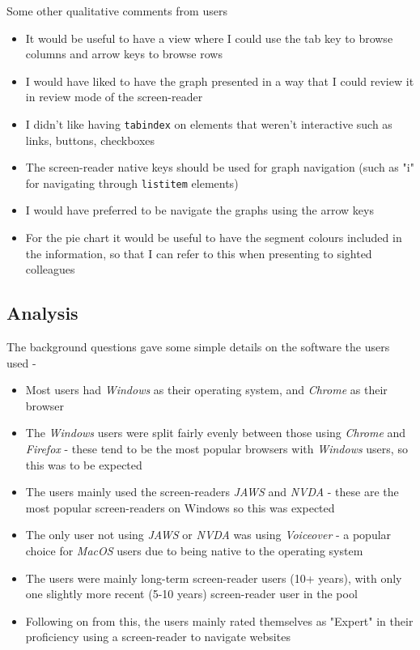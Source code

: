 \documentclass[ %
                    author={Aleena Baig},
                supervisor={Dr Simon Lock},
                    degree={BSc},
                     title={On Making Web Accessible Graphs},
                  subtitle={},
                      year={2019} ]{dissertation}
\begin{document}
Some other qualitative comments from users

\begin{itemize}
    \item It would be useful to have a view where I could use the tab key to browse columns and arrow keys to browse rows
    \item I would have liked to have the graph presented in a way that I could review it in review mode of the screen-reader
    \item I didn't like having \texttt{tabindex} on elements that weren't interactive such as links, buttons, checkboxes
    \item The screen-reader native keys should be used for graph navigation (such as "i" for navigating through \texttt{listitem} elements)
    \item I would have preferred to be navigate the graphs using the arrow keys
    \item For the pie chart it would be useful to have the segment colours included in the information, so that I can refer to this when presenting to sighted colleagues
\end{itemize}

\subsection{Analysis}

The background questions gave some simple details on the software the users used -

\begin{itemize}
    \item Most users had \textit{Windows} as their operating system, and \textit{Chrome} as their browser
    \item The \textit{Windows} users were split fairly evenly between those using \textit{Chrome} and \textit{Firefox} - these tend to be the most popular browsers with \textit{Windows} users, so this was to be expected
    \item The users mainly used the screen-readers \textit{JAWS} and \textit{NVDA} - these are the most popular screen-readers on Windows so this was expected
    \item The only user not using \textit{JAWS} or \textit{NVDA} was using \textit{Voiceover} - a popular choice for \textit{MacOS} users due to being native to the operating system
    \item The users were mainly long-term screen-reader users (10+ years), with only one slightly more recent (5-10 years) screen-reader user in the pool
    \item Following on from this, the users mainly rated themselves as "Expert" in their proficiency using a screen-reader to navigate websites
\end{itemize}
\end{document}
